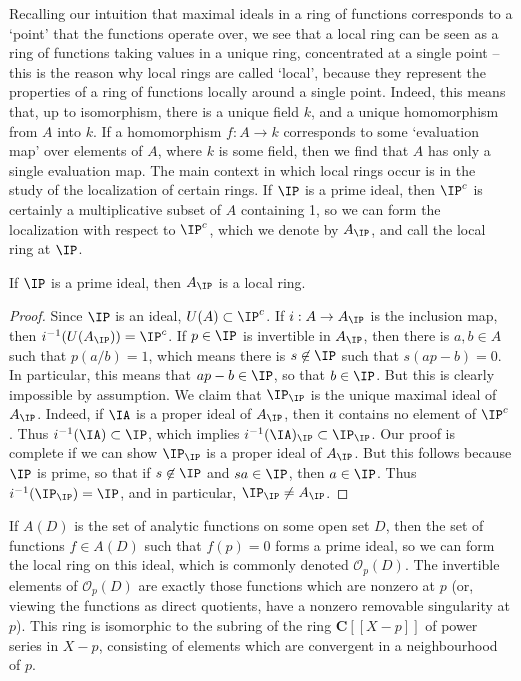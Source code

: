 Recalling our intuition that maximal ideals in a ring of functions corresponds to a `point' that the functions operate over, we see that a local ring can be seen as a ring of functions taking values in a unique ring, concentrated at a single point -- this is the reason why local rings are called `local', because they represent the properties of a ring of functions locally around a single point. Indeed, this means that, up to isomorphism, there is a unique field $k$, and a unique homomorphism from $A$ into $k$. If a homomorphism $f: A \to k$ corresponds to some `evaluation map' over elements of $A$, where $k$ is some field, then we find that $A$ has only a single evaluation map. The main context in which local rings occur is in the study of the localization of certain rings. If $\IP$ is a prime ideal, then $\IP^c$ is certainly a multiplicative subset of $A$ containing 1, so we can form the localization with respect to $\IP^c$, which we denote by $A_{\IP}$, and call the local ring at $\IP$.

\begin{theorem}
    If $\IP$ is a prime ideal, then $A_{\IP}$ is a local ring.
\end{theorem}
\begin{proof}
    Since $\IP$ is an ideal, $U(A) \subset \IP^c$. If $i: A \to A_{\IP}$ is the inclusion map, then $i^{-1}(U(A_{\IP})) = \IP^c$. If $p \in \IP$ is invertible in $A_{\IP}$, then there is $a,b \in A$ such that $p(a/b) = 1$, which means there is $s \not \in \IP$ such that $s(ap - b) = 0$. In particular, this means that $ap - b \in \IP$, so that $b \in \IP$. But this is clearly impossible by assumption. We claim that $\IP_{\IP}$ is the unique maximal ideal of $A_{\IP}$. Indeed, if $\IA$ is a proper ideal of $A_{\IP}$, then it contains no element of $\IP^c$. Thus $i^{-1}(\IA) \subset \IP$, which implies $i^{-1}(\IA)_{\IP} \subset \IP_{\IP}$. Our proof is complete if we can show $\IP_{\IP}$ is a proper ideal of $A_{\IP}$. But this follows because $\IP$ is prime, so that if $s \not \in \IP$ and $sa \in \IP$, then $a \in \IP$. Thus $i^{-1}(\IP_{\IP}) = \IP$, and in particular, $\IP_{\IP} \neq A_{\IP}$.
\end{proof}

\begin{example}
    If $A(D)$ is the set of analytic functions on some open set $D$, then the set of functions $f \in A(D)$ such that $f(p) = 0$ forms a prime ideal, so we can form the local ring on this ideal, which is commonly denoted $\mathcal{O}_p(D)$. The invertible elements of $\mathcal{O}_p(D)$ are exactly those functions which are nonzero at $p$ (or, viewing the functions as direct quotients, have a nonzero removable singularity at $p$). This ring is isomorphic to the subring of the ring $\mathbf{C}[[X-p]]$ of power series in $X-p$, consisting of elements which are convergent in a neighbourhood of $p$.
\end{example}

